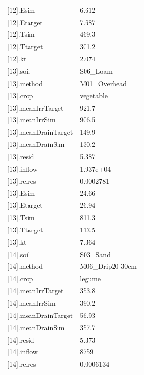 {\begin{longtable}{p{}p{}}
{}[12].Esim & 6.612\\
{}[12].Etarget & 7.687\\
{}[12].Tsim & 469.3\\
{}[12].Ttarget & 301.2\\
{}[12].kt & 2.074\\
{}[13].soil & S06\_Loam\\
{}[13].method & M01\_Overhead\\
{}[13].crop & vegetable\\
{}[13].meanIrrTarget & 921.7\\
{}[13].meanIrrSim & 906.5\\
{}[13].meanDrainTarget & 149.9\\
{}[13].meanDrainSim & 130.2\\
{}[13].resid & 5.387\\
{}[13].inflow & 1.937e+04\\
{}[13].relres & 0.0002781\\
{}[13].Esim & 24.66\\
{}[13].Etarget & 26.94\\
{}[13].Tsim & 811.3\\
{}[13].Ttarget & 113.5\\
{}[13].kt & 7.364\\
{}[14].soil & S03\_Sand\\
{}[14].method & M06\_Drip20-30cm\\
{}[14].crop & legume\\
{}[14].meanIrrTarget & 353.8\\
{}[14].meanIrrSim & 390.2\\
{}[14].meanDrainTarget & 56.93\\
{}[14].meanDrainSim & 357.7\\
{}[14].resid & 5.373\\
{}[14].inflow & 8759\\
{}[14].relres & 0.0006134\\
\bottomrule\end{longtable}}

